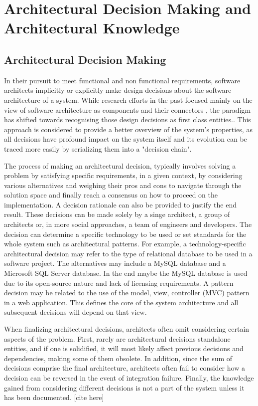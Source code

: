 \chapter{Architectural Decision Making and Architectural Knowledge}
    \section{Architectural Decision Making}
        In their pursuit to meet functional and non functional requirements, software architects implicitly or explicitly make design decisions about the software architecture of a system. While research efforts in the past focused mainly on the view of software architecture as components and their connectors \cite{software_arch_in_practice_book}, the paradigm has shifted towards recognising those design decisions as first class entities.\cite{first-class-Arch-decisions}. This approach is considered to provide a better overview of the system's properties, as all decisions have profound impact on the system itself and its evolution can be traced more easily by serializing them into a "decision chain".

        The process of making an architectural decision, typically involves solving a problem by satisfying specific requirements, in a given context, by considering various alternatives and weighing their pros and cons to navigate through the solution space and finally reach a consensus on how to proceed on the implementation. A decision rationale can also be provided to justify the end result. These decisions can be made solely by a singe architect, a group of architects or, in more social approaches, a team of engineers and developers. The decision can determine a specific technology to be used \cite{developer-study-arch-decisions}or set standards for the whole system such as architectural patterns. For example, a technology-specific architectural decision may refer to the type of relational database to be used in a software project. The alternatives may include a MySQL database and a Microsoft SQL Server database. In the end maybe the MySQL database is used due to its open-source nature and lack of licensing requirements. A pattern decision may be related to the use of the model, view, controller (MVC) pattern in a web application. This defines the core of the system architecture and all subsequent decisions will depend on that view. 

        When finalizing architectural decisions, architects often omit considering certain aspects of the problem. First, rarely are architectural decisions standalone entities, and if one is solidified, it will most likely affect previous decisions and dependencies, making some of them obsolete. In addition, since the sum of decisions comprise the final architecture, architects often fail to consider how a decision can be reversed in the event of integration failure. Finally, the knowledge gained from considering different decisions is not a part of the system unless it has been documented. [cite here]

